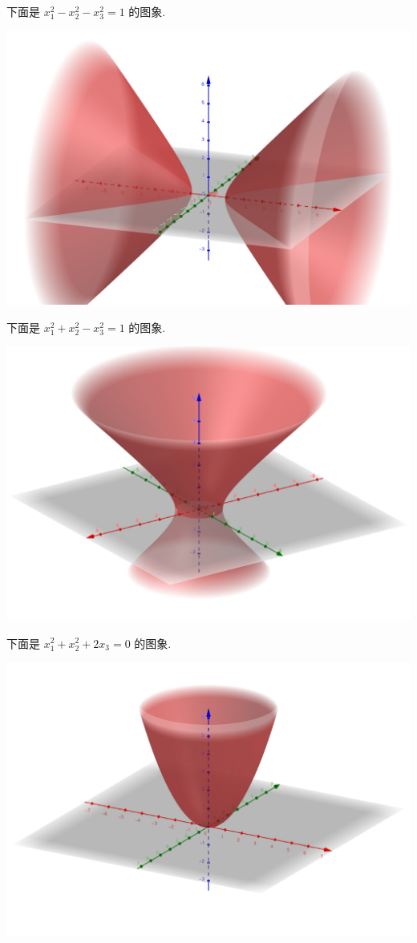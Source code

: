 \documentclass[color=black,device=normal,lang=cn,mode=geye]{elegantnote}
\begin{document}
下面是 $x_1^2-x_2^2-x_3^2=1$ 的图象.
\begin{center}
    \includegraphics[scale=.2]{materials/1.png}
\end{center}
下面是 $x_1^2+x_2^2-x_3^2=1$ 的图象.
\begin{center}
    \includegraphics[scale=.2]{materials/2.png}
\end{center}
下面是 $x_1^2+x_2^2+2x_3=0$ 的图象.
\begin{center}
    \includegraphics[scale=.2]{materials/3.png}
\end{center}
\end{document}
